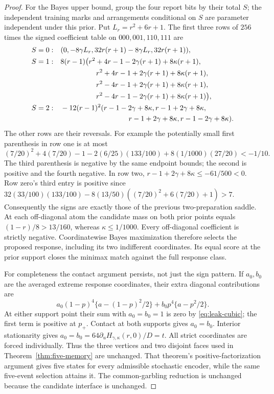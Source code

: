 \begin{proof}
For the Bayes upper bound, group the four report bits by their total
$S$; the independent training marks and arrangements conditional on $S$
are parameter independent under this prior. Put $L_r=r^2+6r+1$.
The first three rows of $256$ times the signed coefficient table on
$000,001,110,111$ are
\begin{align*}
 S=0:
 &\quad(0,-8\gamma L_r,32r(r+1)-8\gamma L_r,32r(r+1)),\\
 S=1:
 &\quad8(r-1)\bigl(r^2+4r-1-2\gamma(r+1)+8\kappa(r+1),\\
 &\hspace{21mm}r^2+4r-1+2\gamma(r+1)+8\kappa(r+1),\\
 &\hspace{21mm}r^2-4r-1+2\gamma(r+1)+8\kappa(r+1),\\
 &\hspace{21mm}r^2-4r-1-2\gamma(r+1)+8\kappa(r+1)\bigr),\\
 S=2:
 &\quad-12(r-1)^2(r-1-2\gamma+8\kappa,
              r-1+2\gamma+8\kappa,\\
 &\hspace{37mm}r-1+2\gamma+8\kappa,r-1-2\gamma+8\kappa).
\end{align*}
The other rows are their reversals. For example the potentially small
first parenthesis in row one is at most
\[
 (7/20)^2+4(7/20)-1-2(6/25)(133/100)
                         +8(1/1000)(27/20)<-1/10.
\]
The third parenthesis is negative by the same endpoint bounds; the
second is positive and the fourth negative. In row two,
$r-1+2\gamma+8\kappa\le-61/500<0$.
Row zero's third entry is positive since
$32(33/100)(133/100)-8(13/50)((7/20)^2+6(7/20)+1)>7$.
Consequently the signs are exactly those of the previous two-preparation
saddle. At each off-diagonal atom the candidate mass on both prior
points equals $(1-r)/8>13/160$, whereas $\kappa\le1/1000$.
Every off-diagonal coefficient is strictly negative. Coordinatewise
Bayes maximization therefore selects the proposed response, including
its two indifferent coordinates. Its equal score at the prior support
closes the minimax match against the full response class.

For completeness the contact argument persists, not just the sign
pattern. If $a_0,b_0$ are the averaged extreme response coordinates,
their extra diagonal contributions are
\[
 a_0(1-p)^4\{a-(1-p)^2/2\}
       +b_0p^4\{a-p^2/2\}.
\]
At either support point their sum with $a_0=b_0=1$ is zero by
\eqref{eq:leak-cubic}; the first term is positive at $p_+$.
Contact at both supports gives $a_0=b_0$. Interior stationarity gives
$a_0=b_0=64\partial_uH_{\gamma,\kappa}(r,0)/D=t$.
All strict coordinates are forced individually. Thus the three vertices
and two disjoint faces used in Theorem~\ref{thm:five-memory} are
unchanged. That theorem's positive-factorization argument gives five
states for every admissible stochastic encoder, while the same
five-event selection attains it. The common-garbling reduction is
unchanged because the candidate interface is unchanged.
\end{proof}

